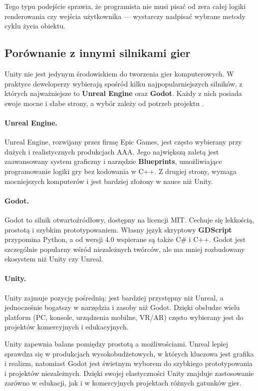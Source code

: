 \documentclass[a4paper,12pt]{book} %
\begin{document}
Tego typu podejście sprawia, że programista nie musi pisać od zera całej logiki renderowania czy wejścia użytkownika — 
wystarczy nadpisać wybrane metody cyklu życia obiektu.  

\subsection{Porównanie z innymi silnikami gier}

Unity nie jest jedynym środowiskiem do tworzenia gier komputerowych. 
W praktyce deweloperzy wybierają spośród kilku najpopularniejszych silników, 
z których najważniejsze to \textbf{Unreal Engine} oraz \textbf{Godot}. 
Każdy z nich posiada swoje mocne i słabe strony, a wybór zależy od potrzeb projektu \cite{Unity_Manual, Unreal, Godot}. 

\paragraph{Unreal Engine.}  
Unreal Engine, rozwijany przez firmę Epic Games, 
jest często wybierany przy dużych i realistycznych produkcjach AAA. 
Jego największą zaletą jest zaawansowany system graficzny i narzędzie \textbf{Blueprints}, 
umożliwiające programowanie logiki gry bez kodowania w C++. 
Z drugiej strony, wymaga mocniejszych komputerów i jest bardziej złożony w nauce niż Unity.  

\paragraph{Godot.}  
Godot to silnik otwartoźródłowy, dostępny na licencji MIT. 
Cechuje się lekkością, prostotą i szybkim prototypowaniem. 
Własny język skryptowy \textbf{GDScript} przypomina Python, 
a od wersji 4.0 wspierane są także C\# i C++. 
Godot jest szczególnie popularny wśród niezależnych twórców, 
ale ma mniej rozbudowany ekosystem niż Unity czy Unreal.  

\paragraph{Unity.}  
Unity zajmuje pozycję pośrednią: 
jest bardziej przystępny niż Unreal, 
a jednocześnie bogatszy w narzędzia i zasoby niż Godot. 
Dzięki obsłudze wielu platform (PC, konsole, urządzenia mobilne, VR/AR) 
często wybierany jest do projektów komercyjnych i edukacyjnych.

Unity zapewnia balans pomiędzy prostotą a możliwościami. 
Unreal lepiej sprawdza się w produkcjach wysokobudżetowych, 
w których kluczowa jest grafika i realizm, 
natomiast Godot jest świetnym wyborem do szybkiego prototypowania i projektów niezależnych. 
Dzięki swojej elastyczności Unity znajduje zastosowanie zarówno w edukacji, 
jak i w komercyjnych projektach różnych gatunków gier. 
\end{document}
